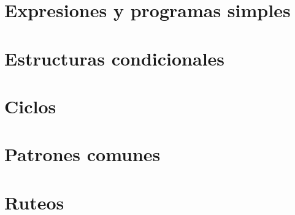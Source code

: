 \chapter{Expresiones y programas simples}












\chapter{Estructuras condicionales}












\chapter{Ciclos}












\chapter{Patrones comunes}










\chapter{Ruteos}



